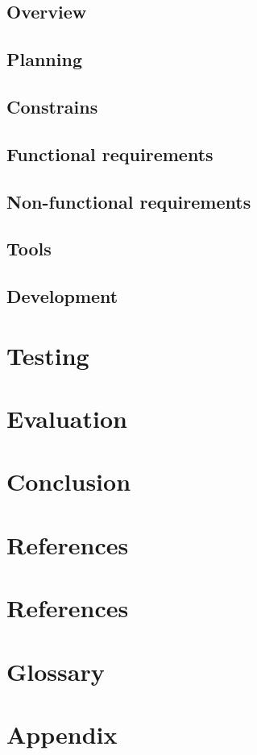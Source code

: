\documentclass{article}
\begin{document}
  \subsection{Overview}
  \subsection{Planning}
  \subsection{Constrains}
  \subsection{Functional requirements}
  \subsection{Non-functional requirements}
  \subsection{Tools}
  \subsection{Development}

  \newpage
  \section{Testing}

  \newpage
  \section{Evaluation}

  \newpage
  \section{Conclusion}

  \newpage
  \section{References}

  \newpage
  \section{References}

  \newpage
  \section{Glossary}

  \newpage
  \section{Appendix}
\end{document}
